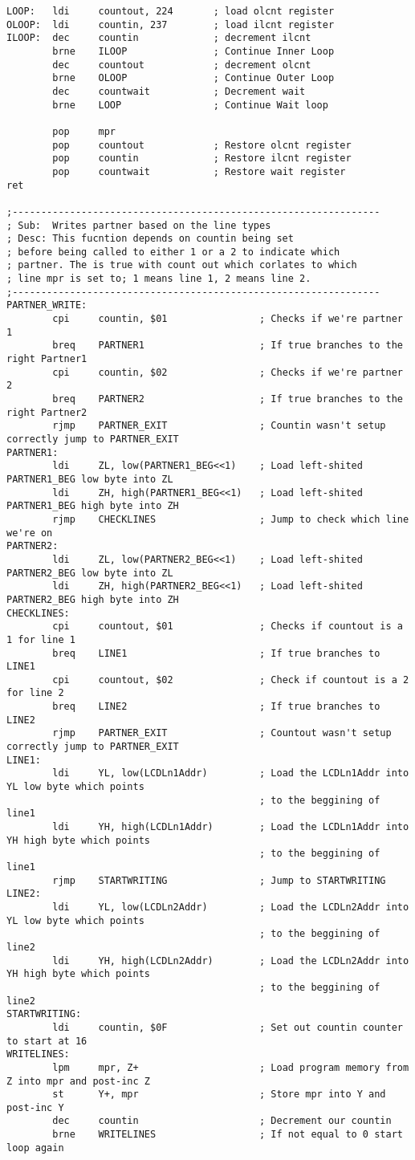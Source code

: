 \documentclass[12pt, letterpaper]{article}
\begin{document}
\begin{verbatim}
LOOP:	ldi		countout, 224		; load olcnt register
OLOOP:	ldi		countin, 237		; load ilcnt register
ILOOP:	dec		countin				; decrement ilcnt
		brne	ILOOP				; Continue Inner Loop
		dec		countout			; decrement olcnt
		brne	OLOOP				; Continue Outer Loop
		dec		countwait			; Decrement wait 
		brne	LOOP				; Continue Wait loop	

		pop		mpr
		pop		countout			; Restore olcnt register
		pop		countin				; Restore ilcnt register
		pop		countwait			; Restore wait register
ret	

;----------------------------------------------------------------
; Sub:	Writes partner based on the line types
; Desc:	This fucntion depends on countin being set
; before being called to either 1 or a 2 to indicate which 
; partner. The is true with count out which corlates to which
; line mpr is set to; 1 means line 1, 2 means line 2.
;----------------------------------------------------------------
PARTNER_WRITE:
		cpi		countin, $01				; Checks if we're partner 1
		breq	PARTNER1					; If true branches to the right Partner1
		cpi		countin, $02				; Checks if we're partner 2
		breq	PARTNER2					; If true branches to the right Partner2
		rjmp	PARTNER_EXIT				; Countin wasn't setup correctly jump to PARTNER_EXIT
PARTNER1:
		ldi		ZL, low(PARTNER1_BEG<<1)	; Load left-shited PARTNER1_BEG low byte into ZL
		ldi		ZH, high(PARTNER1_BEG<<1)	; Load left-shited PARTNER1_BEG high byte into ZH
		rjmp	CHECKLINES					; Jump to check which line we're on
PARTNER2:
		ldi		ZL, low(PARTNER2_BEG<<1)	; Load left-shited PARTNER2_BEG low byte into ZL
		ldi		ZH, high(PARTNER2_BEG<<1)	; Load left-shited PARTNER2_BEG high byte into ZH
CHECKLINES:
		cpi		countout, $01				; Checks if countout is a 1 for line 1
		breq	LINE1						; If true branches to LINE1
		cpi		countout, $02				; Check if countout is a 2 for line 2
		breq	LINE2						; If true branches to LINE2
		rjmp	PARTNER_EXIT				; Countout wasn't setup correctly jump to PARTNER_EXIT
LINE1:
		ldi		YL, low(LCDLn1Addr)			; Load the LCDLn1Addr into YL low byte which points
											; to the beggining of line1
		ldi		YH, high(LCDLn1Addr)		; Load the LCDLn1Addr into YH high byte which points
											; to the beggining of line1
		rjmp	STARTWRITING				; Jump to STARTWRITING
LINE2:
		ldi		YL, low(LCDLn2Addr)			; Load the LCDLn2Addr into YL low byte which points
											; to the beggining of line2
		ldi		YH, high(LCDLn2Addr)		; Load the LCDLn2Addr into YH high byte which points
											; to the beggining of line2
STARTWRITING:
		ldi		countin, $0F				; Set out countin counter to start at 16
WRITELINES:
		lpm		mpr, Z+						; Load program memory from Z into mpr and post-inc Z
		st		Y+, mpr						; Store mpr into Y and post-inc Y
		dec		countin						; Decrement our countin
		brne	WRITELINES					; If not equal to 0 start loop again


\end{verbatim}
\end{document}
